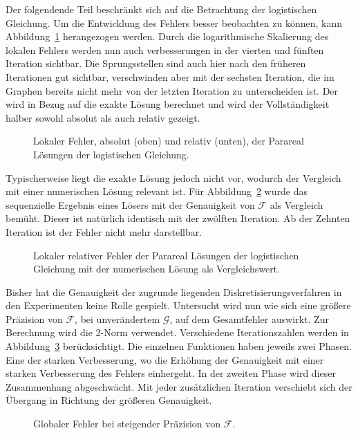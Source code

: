 Der folgendende Teil beschränkt sich auf die Betrachtung der logistischen Gleichung. Um die Entwicklung des Fehlers besser beobachten zu können, kann Abbildung~\ref{fig:iter_error_local} herangezogen werden. Durch die logarithmische Skalierung des lokalen Fehlers werden nun auch verbesserungen in der vierten und fünften Iteration sichtbar. Die Sprungsstellen sind auch hier nach den früheren Iterationen gut sichtbar, verschwinden aber mit der sechsten Iteration, die im Graphen bereits nicht mehr von der letzten Iteration zu unterscheiden ist. Der wird in Bezug auf die exakte Lösung berechnet und wird der Vollständigkeit halber sowohl absolut als auch relativ gezeigt.
\begin{figure}[ht]
    \centering
        
        
    \caption{Lokaler Fehler, absolut (oben) und relativ (unten), der Parareal Lösungen der logistischen Gleichung.}
    \label{fig:iter_error_local}
\end{figure}
Typischerweise liegt die exakte Lösung jedoch nicht vor, wodurch der Vergleich mit einer numerischen Lösung relevant ist. Für Abbildung~\ref{fig:iter_error_local_num} wurde das sequenzielle Ergebnis eines Lösers mit der Genauigkeit von \(\mathcal{F}\) als Vergleich bemüht. Dieser ist natürlich identisch mit der zwölften Iteration. Ab der Zehnten Iteration ist der Fehler nicht mehr darstellbar.\\
\begin{figure}[ht]
    \centering
        
    \caption{Lokaler relativer Fehler der Parareal Lösungen der logistischen Gleichung mit der numerischen Lösung als Vergleichswert.}
    \label{fig:iter_error_local_num}
\end{figure}

Bisher hat die Genauigkeit der zugrunde liegenden Diskretisierungsverfahren in den Experimenten keine Rolle gespielt. Untersucht wird nun wie sich eine größere Präzision von \(\mathcal{F}\), bei unverändertem \(\mathcal{G}\), auf dem Gesamtfehler auswirkt. Zur Berechnung wird die 2-Norm verwendet. Verschiedene Iterationszahlen werden in Abbildung~\ref{fig:iter_error} berücksichtigt. Die einzelnen Funktionen haben jeweils zwei Phasen. Eine der starken Verbesserung, wo die Erhöhung der Genauigkeit mit einer starken Verbesserung des Fehlers einhergeht. In der zweiten Phase wird dieser Zusammenhang abgeschwächt. Mit jeder zusätzlichen Iteration verschiebt sich der Übergang in Richtung der größeren Genauigkeit.
\begin{figure}[ht]
    \centering
        
    \caption{Globaler Fehler bei steigender Präzision von \(\mathcal{F}\).}
    \label{fig:iter_error}
\end{figure}

